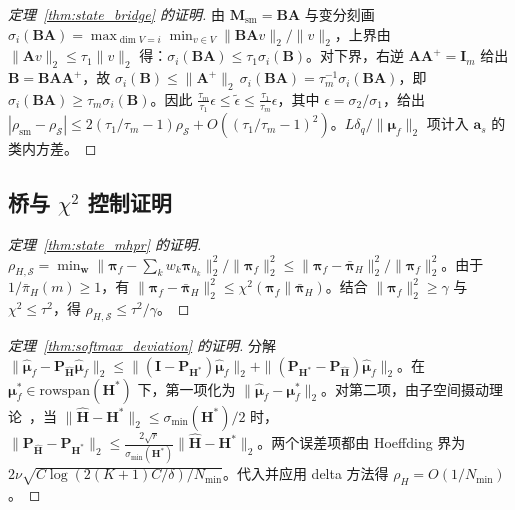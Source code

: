 \begin{proof}[定理~\ref{thm:state_bridge} 的证明]
由 $\mathbf{M}_{\mathrm{sm}} = \mathbf{B}\mathbf{A}$ 与变分刻画 $\sigma_i(\mathbf{B}\mathbf{A})=\max_{\dim V=i}\min_{v\in V}\|\mathbf{B}\mathbf{A}v\|_2/\|v\|_2$，上界由 $\|\mathbf{A}v\|_2\le\tau_1\|v\|_2$ 得：$\sigma_i(\mathbf{B}\mathbf{A})\le\tau_1\sigma_i(\mathbf{B})$。对下界，右逆 $\mathbf{A}\mathbf{A}^+=\mathbf{I}_m$ 给出 $\mathbf{B}=\mathbf{B}\mathbf{A}\mathbf{A}^+$，故 $\sigma_i(\mathbf{B})\le\|\mathbf{A}^+\|_2\,\sigma_i(\mathbf{B}\mathbf{A})=\tau_m^{-1}\sigma_i(\mathbf{B}\mathbf{A})$，即 $\sigma_i(\mathbf{B}\mathbf{A})\ge\tau_m\sigma_i(\mathbf{B})$。因此 $\frac{\tau_m}{\tau_1}\epsilon \le \tilde{\epsilon} \le \frac{\tau_1}{\tau_m}\epsilon$，其中 $\epsilon=\sigma_2/\sigma_1$，给出 $|\rho_{\mathrm{sm}}-\rho_{\mathcal{S}}| \le 2(\tau_1/\tau_m-1)\rho_{\mathcal{S}} + O((\tau_1/\tau_m-1)^2)$。$L\delta_q/\|\boldsymbol{\mu}_f\|_2$ 项计入 $\mathbf{a}_s$ 的类内方差。
\end{proof}

\subsection{桥与 $\chi^2$ 控制证明}
\label{app:bridge_proofs}

\begin{proof}[定理~\ref{thm:state_mhpr} 的证明]
$\rho_{H,\mathcal{S}} = \min_{\mathbf{w}} \|\boldsymbol{\pi}_f - \sum_k w_k\boldsymbol{\pi}_{h_k}\|_2^2 / \|\boldsymbol{\pi}_f\|_2^2 \le \|\boldsymbol{\pi}_f - \bar{\boldsymbol{\pi}}_H\|_2^2 / \|\boldsymbol{\pi}_f\|_2^2$。由于 $1/\bar{\pi}_H(m) \ge 1$，有 $\|\boldsymbol{\pi}_f - \bar{\boldsymbol{\pi}}_H\|_2^2 \le \chi^2(\boldsymbol{\pi}_f\|\bar{\boldsymbol{\pi}}_H)$。结合 $\|\boldsymbol{\pi}_f\|_2^2 \ge \gamma$ 与 $\chi^2 \le \tau^2$，得 $\rho_{H,\mathcal{S}} \le \tau^2/\gamma$。
\end{proof}

\begin{proof}[定理~\ref{thm:softmax_deviation} 的证明]
分解 $\|\hat{\boldsymbol{\mu}}_f - \mathbf{P}_{\hat{\mathbf{H}}}\hat{\boldsymbol{\mu}}_f\|_2 \le \|(\mathbf{I} - \mathbf{P}_{\mathbf{H}^*})\hat{\boldsymbol{\mu}}_f\|_2 + \|(\mathbf{P}_{\mathbf{H}^*} - \mathbf{P}_{\hat{\mathbf{H}}})\hat{\boldsymbol{\mu}}_f\|_2$。在 $\boldsymbol{\mu}_f^* \in \mathrm{rowspan}(\mathbf{H}^*)$ 下，第一项化为 $\|\hat{\boldsymbol{\mu}}_f - \boldsymbol{\mu}_f^*\|_2$。对第二项，由子空间摄动理论~\cite{stewart1990matrix}，当 $\|\hat{\mathbf{H}}-\mathbf{H}^*\|_2 \le \sigma_{\min}(\mathbf{H}^*)/2$ 时，$\|\mathbf{P}_{\hat{\mathbf{H}}} - \mathbf{P}_{\mathbf{H}^*}\|_2 \le \frac{2\sqrt{r}}{\sigma_{\min}(\mathbf{H}^*)}\|\hat{\mathbf{H}}-\mathbf{H}^*\|_2$。两个误差项都由 Hoeffding 界为 $2\nu\sqrt{C\log(2(K+1)C/\delta)/N_{\min}}$。代入并应用 delta 方法得 $\rho_H = O(1/N_{\min})$。
\end{proof}

